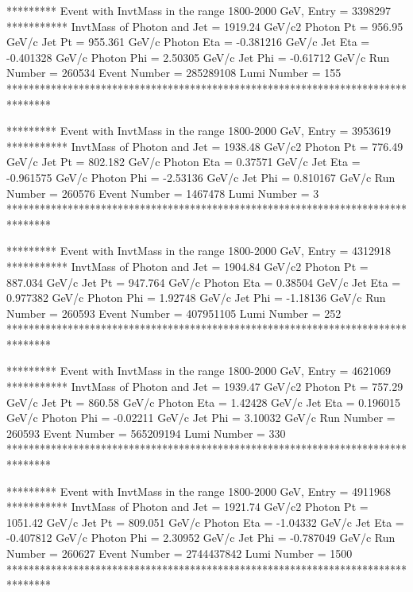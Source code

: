                                                                      
********* Event with InvtMass in the range 1800-2000 GeV, Entry = 3398297 ***********
InvtMass of Photon and Jet = 1919.24 GeV/c2
Photon Pt = 956.95 GeV/c
Jet Pt = 955.361 GeV/c
Photon Eta = -0.381216 GeV/c
Jet Eta = -0.401328 GeV/c
Photon Phi = 2.50305 GeV/c
Jet Phi = -0.61712 GeV/c
Run Number = 260534
Event Number = 285289108
Lumi Number = 155
********************************************************************************
                                                                     
                                                                     
********* Event with InvtMass in the range 1800-2000 GeV, Entry = 3953619 ***********
InvtMass of Photon and Jet = 1938.48 GeV/c2
Photon Pt = 776.49 GeV/c
Jet Pt = 802.182 GeV/c
Photon Eta = 0.37571 GeV/c
Jet Eta = -0.961575 GeV/c
Photon Phi = -2.53136 GeV/c
Jet Phi = 0.810167 GeV/c
Run Number = 260576
Event Number = 1467478
Lumi Number = 3
********************************************************************************
                                                                     
                                                                     
********* Event with InvtMass in the range 1800-2000 GeV, Entry = 4312918 ***********
InvtMass of Photon and Jet = 1904.84 GeV/c2
Photon Pt = 887.034 GeV/c
Jet Pt = 947.764 GeV/c
Photon Eta = 0.38504 GeV/c
Jet Eta = 0.977382 GeV/c
Photon Phi = 1.92748 GeV/c
Jet Phi = -1.18136 GeV/c
Run Number = 260593
Event Number = 407951105
Lumi Number = 252
********************************************************************************
                                                                     
                                                                     
********* Event with InvtMass in the range 1800-2000 GeV, Entry = 4621069 ***********
InvtMass of Photon and Jet = 1939.47 GeV/c2
Photon Pt = 757.29 GeV/c
Jet Pt = 860.58 GeV/c
Photon Eta = 1.42428 GeV/c
Jet Eta = 0.196015 GeV/c
Photon Phi = -0.02211 GeV/c
Jet Phi = 3.10032 GeV/c
Run Number = 260593
Event Number = 565209194
Lumi Number = 330
********************************************************************************
                                                                     
                                                                     
********* Event with InvtMass in the range 1800-2000 GeV, Entry = 4911968 ***********
InvtMass of Photon and Jet = 1921.74 GeV/c2
Photon Pt = 1051.42 GeV/c
Jet Pt = 809.051 GeV/c
Photon Eta = -1.04332 GeV/c
Jet Eta = -0.407812 GeV/c
Photon Phi = 2.30952 GeV/c
Jet Phi = -0.787049 GeV/c
Run Number = 260627
Event Number = 2744437842
Lumi Number = 1500
********************************************************************************
                                                                     

